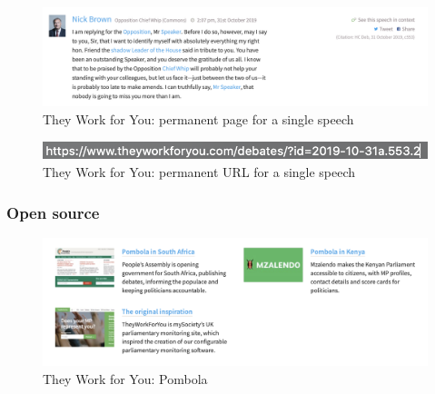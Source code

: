 \documentclass{article}
\begin{document}
			\begin{figure}
				\centering
				\includegraphics[scale=0.3]{images/they-work-for-you-implementation-permanent-urls-2}
				\caption{They Work for You: permanent page for a single speech}
				\label{fig:they-work-for-you-implementation-permanent-urls-2}
			\end{figure}

			\begin{figure}
				\centering
				\includegraphics[scale=0.5]{images/they-work-for-you-implementation-permanent-urls-3}
				\caption{They Work for You: permanent URL for a single speech}
				\label{fig:they-work-for-you-implementation-permanent-urls-3}
			\end{figure}
					
        	\subsubsection*{Open source}
        	

			\begin{figure}
				\centering
				\includegraphics[scale=0.4]{images/they-work-for-you-implementation-open-source-pombola}
				\caption{They Work for You: Pombola}
				\label{fig:they-work-for-you-implementation-open-source-pombola}
			\end{figure}
			
\end{document}
